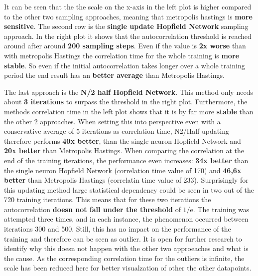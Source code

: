 It can be seen that the the scale on the x-axis in the left plot is higher compared to the other two sampling approaches, 
meaning that metropolis hastings is \textbf{more sensitive}. 
The second row is the \textbf{single update Hopfield Network} sampling approach. 
In the right plot it shows that the autocorrelation threshold is reached around after around \textbf{200 sampling steps}.
Even if the value is \textbf{2x worse} than with metropolis Hastings the correlation time for the whole training is \textbf{more stable}.
So even if the initial autocorrelation takes longer over a whole training period the end result has an \textbf{better average} than Metropolis Hastings.

The last approach is the \textbf{N/2 half Hopfield Network}. 
This method only needs about \textbf{3 iterations} to surpass the threshold in the right plot.
Furthermore, the methods correlation time in the left plot shows that it is by far more \textbf{stable} than the other 2 approaches.
When setting this into perspective even with a conservative average of 5 iterations as correlation time, N2/Half updating therefore
performs \textbf{40x better}, than the single neuron Hopfield Network and \textbf{20x better} than Metropolis Hastings.
When comparing the correlation at the end of the training iterations, the performance even increases: \textbf{34x better} than the single neuron Hopfield Network (correlation time value of 170) and \textbf{46,6x better} than Metropolis Hastings (correlatin time value of 233).
Surprisingly for this updating method large statistical dependency could be seen in two out of the 720 training iterations.
This means that for these two iterations the autocorrelation \textbf{doesn not fall under the threshold} of \(1/\mathrm{e}\).
The training was attempted three times, and in each instance, the phenomenon occurred between iterations 300 and 500.
Still, this has no impact on the performance of the training and therefore can be seen as outlier.
It is open for further research to identify why this doesn not happen with the other two approeaches and what is the cause.
As the corresponding correlation time for the outliers is infinite, the scale has been reduced here for better visualzation of other the other datapoints.

